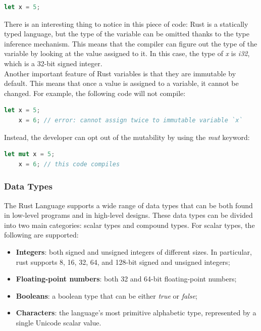 \begin{lstlisting}[language=Rust]
    let x = 5;
\end{lstlisting}

There is an interesting thing to notice in this piece of code: Rust is a statically typed language, but the type of the variable can be omitted thanks to the type inference mechanism. This means that the compiler can figure out the type of the variable by looking at the value assigned to it. In this case, the type of \textit{x} is \textit{i32}, which is a 32-bit signed integer. \\

Another important feature of Rust variables is that they are immutable by default. This means that once a value is assigned to a variable, it cannot be changed.
For example, the following code will not compile:

\begin{lstlisting}[language=Rust]
    let x = 5;
    x = 6; // error: cannot assign twice to immutable variable `x`
\end{lstlisting}

Instead, the developer can opt out of the mutability by using the \textit{mut} keyword:

\begin{lstlisting}[language=Rust]
    let mut x = 5;
    x = 6; // this code compiles
\end{lstlisting}

\subsubsection{Data Types}
The Rust Language supports a wide range of data types that can be both found in low-level programs and in high-level designs. These data types can be divided into two main categories: scalar types and compound types.
For scalar types, the following are supported:
\begin{itemize}
    \item \textbf{Integers}: both signed and unsigned integers of different sizes. In particular, rust supports 8, 16, 32, 64, and 128-bit signed and unsigned integers;
    \item \textbf{Floating-point numbers}: both 32 and 64-bit floating-point numbers;
    \item \textbf{Booleans}: a boolean type that can be either \textit{true} or \textit{false};
    \item \textbf{Characters}: the language's most primitive alphabetic type, represented by a single Unicode scalar value.
\end{itemize}

